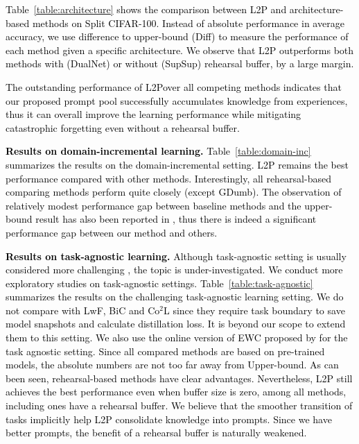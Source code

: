 \documentclass[10pt,twocolumn,letterpaper]{article}
\newcommand{\zizhaoz}[1]{\textcolor{black}{#1}}
\newcommand{\zifeng}[1]{\textcolor{black}{#1}}
\newcommand{\cam}[1]{\textcolor{black}{#1}}
\newcommand{\methodabbr}{L2P\xspace}
\begin{document}
\cam{Table~\ref{table:architecture} shows the comparison between \methodabbr and architecture-based methods on Split CIFAR-100. Instead of absolute performance in average accuracy, we use difference to upper-bound (Diff) to measure the performance of each method given a specific architecture. We observe that \methodabbr outperforms both methods with (DualNet) or without (SupSup) rehearsal buffer, by a large margin. %
}

\zifeng{
The outstanding performance of \methodabbr \cam{over all competing methods} indicates that our proposed prompt pool successfully accumulates knowledge from experiences, thus it can overall improve the learning performance while mitigating catastrophic forgetting even without a rehearsal buffer. 
}

\zifeng{\textbf{Results on domain-incremental learning.} Table~\ref{table:domain-inc} summarizes the results on the domain-incremental setting. 
\methodabbr remains the best performance compared with other methods. %
Interestingly, all rehearsal-based comparing methods perform quite closely (except GDumb). %
\zifeng{The observation of relatively modest performance gap between baseline methods and the upper-bound result has also been reported in \cite{lomonaco2017core50}, thus there is indeed a significant performance gap between our method and others.}
}

\zifeng{
\textbf{Results on task-agnostic learning.}
Although task-agnostic setting is usually considered more challenging \cite{shanahan2021encoders}, the topic is  under-investigated. 
We conduct more exploratory studies on task-agnostic settings.
Table~\ref{table:task-agnostic} summarizes the results on the challenging task-agnostic learning setting. We do not compare with LwF, BiC and Co$^2$L \zizhaoz{since they require task boundary to save model snapshots and calculate distillation loss. It is beyond our scope to extend them to this setting. We also use the online version of EWC proposed by \cite{chaudhry2018riemannian} for the task agnostic setting.}
\zizhaoz{Since all compared methods are based on pre-trained models, the absolute numbers are not too far away from Upper-bound.} As can been seen, rehearsal-based methods have clear advantages.
Nevertheless, \methodabbr still achieves the best performance even when buffer size is zero, among all methods, including ones have a rehearsal buffer. 
We believe that the smoother transition of tasks implicitly help \methodabbr consolidate knowledge into prompts. Since we have better prompts, the benefit of a rehearsal buffer is naturally weakened. 
}
\end{document}
